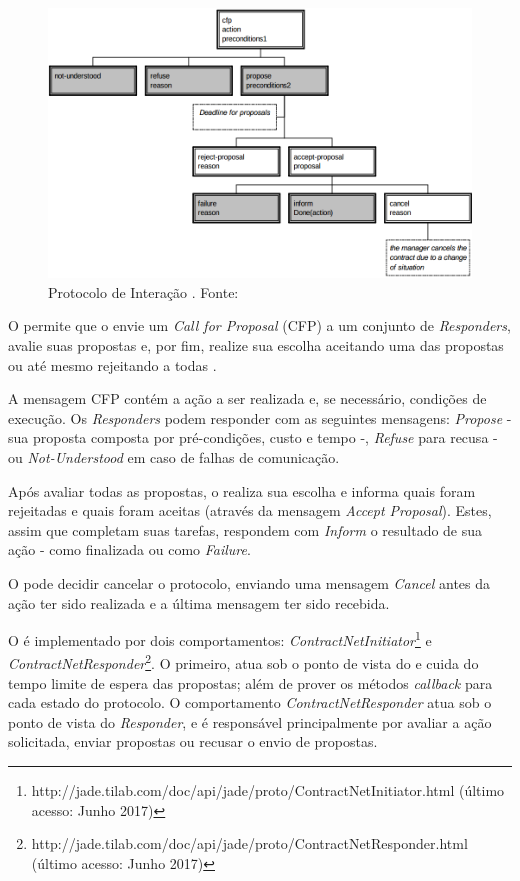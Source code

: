 \begin{description}
    \begin{figure}[!htb]
        \centering
        \includegraphics[scale=0.4]{figuras/contract-net-protocol.png}
        \caption{Protocolo de Interação \contract. Fonte: }
        \label{fig:contract_net_protocol}
    \end{figure}

O \contract permite que o \initiator envie um \textit{Call for Proposal} (CFP) a um conjunto de \textit{Responders}, avalie suas propostas e, por fim, realize sua escolha aceitando uma das propostas ou até mesmo rejeitando a todas \cite{jadeguide}.

A mensagem CFP contém a ação a ser realizada e, se necessário, condições de execução. Os \textit{Responders} podem responder com as seguintes mensagens: \textit{Propose} - sua proposta composta por pré-condições, custo e tempo -, \textit{Refuse} para recusa - ou \textit{Not-Understood} em caso de falhas de comunicação. 

Após avaliar todas as propostas, o \initiator realiza sua escolha e informa quais foram rejeitadas e quais foram aceitas (através da mensagem \textit{Accept Proposal}). Estes, assim que completam suas tarefas, respondem com \textit{Inform} o resultado de sua ação - como finalizada ou como \textit{Failure}.

O \initiator pode decidir cancelar o protocolo, enviando uma mensagem \textit{Cancel} antes da ação ter sido realizada e a última mensagem ter sido recebida.


O \contract é implementado por dois comportamentos: \textit{ContractNetInitiator}\footnote{http://jade.tilab.com/doc/api/jade/proto/ContractNetInitiator.html (último acesso: Junho 2017)} e \textit{ContractNetResponder}\footnote{http://jade.tilab.com/doc/api/jade/proto/ContractNetResponder.html (último acesso: Junho 2017)}. O primeiro, atua sob o ponto de vista do \initiator e cuida do tempo limite de espera das propostas; além de prover os métodos \textit{callback} para cada estado do protocolo. O comportamento \textit{ContractNetResponder} atua sob o ponto de vista do \textit{Responder}, e é responsável principalmente por avaliar a ação solicitada, enviar propostas ou recusar o envio de propostas. 



\end{description}
